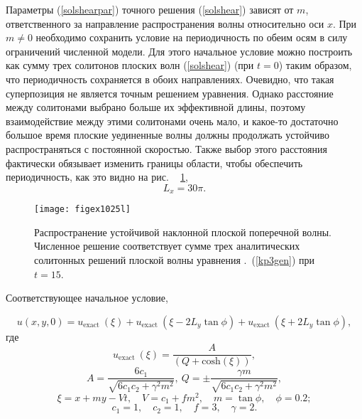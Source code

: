Параметры (\ref{solshearpar}) точного решения (\ref{solshear}) зависят от $ m $, ответственного за направление распространения волны относительно оси $ x $. При $m \ne 0$ необходимо сохранить условие на периодичность по обеим осям в силу ограничений численной модели. Для этого начальное условие можно построить как сумму трех солитонов плоских волн (\ref{solshear}) (при $ t = 0 $) таким образом, что периодичность сохраняется в обоих направлениях. Очевидно, что такая суперпозиция не является точным решением уравнения. Однако расстояние между солитонами выбрано больше их эффективной длины, поэтому взаимодействие между этими солитонами очень мало, и какое-то достаточно большое время плоские уединенные волны должны продолжать устойчиво распространяться с постоянной скоростью. Также выбор этого расстояния фактически обязывает изменить границы области, чтобы обеспечить периодичность, как это видно на рис. ~ \ref{figex1025l},
$$
L_x = 30 \pi.
$$

\begin{figure}
	\centering
	\texttt{[image: figex1025l]}
	\caption{Распространение устойчивой наклонной плоской поперечной волны. Численное решение соответствует сумме трех аналитических солитонных решений плоской волны уравнения .~(\ref{kp3gen}) при $t = 15$.} \label{figex1025l}	
\end{figure}

Соответствующее начальное условие,

\begin{equation}
	\label{kp3ex2}
	u(x,y,0) = u_{\text{exact}}~(\xi ) + u_{\text{exact}}~(\xi - 2 L_y \tan \phi) + u_{\text{exact}}~(\xi + 2 L_y \tan \phi),
\end{equation}
где
\begin{equation}
	u_{\text{exact}}~(\xi ) = \frac{A}{\left(Q+{\text{cosh}} (\xi )\right)},
\end{equation}
\[
A=\frac{6 c_1}{\sqrt{6 c_1 c_2+\gamma ^2 m^2}},~Q=\pm \frac{\gamma  m}{\sqrt{6 c_1 c_2+\gamma ^2 m^2}},
\]
\[
\xi = x + m y - V t, \quad V = c_1+f  m^2, \quad m = \tan{\phi}, \quad \phi = 0.2;
\]
\[
c_1 = 1, \quad c_2 = 1, \quad f = 3, \quad \gamma = 2.
\]

